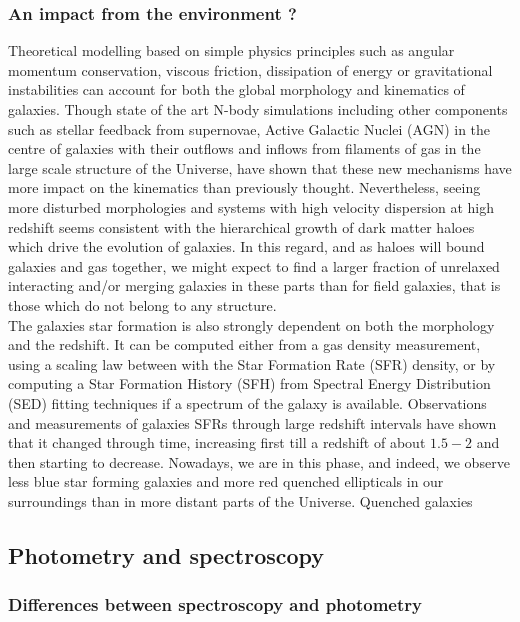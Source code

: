 \subsubsection{An impact from the environment ?}

Theoretical modelling based on simple physics principles such as angular momentum conservation, viscous friction, dissipation of energy or gravitational instabilities can account for both the global morphology and kinematics of galaxies. Though state of the art N-body simulations including other components such as stellar feedback from supernovae, Active Galactic Nuclei (AGN) in the centre of galaxies with their outflows and inflows from filaments of gas in the large scale structure of the Universe, have shown that these new mechanisms have more impact on the kinematics than previously thought. Nevertheless, seeing more disturbed morphologies and systems with high velocity dispersion at high redshift seems consistent with the hierarchical growth of dark matter haloes which drive the evolution of galaxies. In this regard, and as haloes will bound galaxies and gas together, we might expect to find a larger fraction of unrelaxed interacting and/or merging galaxies in these parts than for field galaxies, that is those which do not belong to any structure. \\

The galaxies star formation is also strongly dependent on both the morphology and the redshift. It can be computed either from a gas density measurement, using a scaling law between with the Star Formation Rate (SFR) density, or by computing a Star Formation History (SFH) from Spectral Energy Distribution (SED) fitting techniques if a spectrum of the galaxy is available. Observations and measurements of galaxies SFRs through large redshift intervals have shown that it changed through time, increasing first till a redshift of about $1.5 - 2$ and then starting to decrease. Nowadays, we are in this phase, and indeed, we observe less blue star forming galaxies and more red quenched ellipticals in our surroundings than in more distant parts of the Universe. Quenched galaxies


\subsection{Photometry and spectroscopy}
\label{subsec:diffPhotSpec}

\subsubsection{Differences between spectroscopy and photometry}
\label{subsubsec:photo_data}

